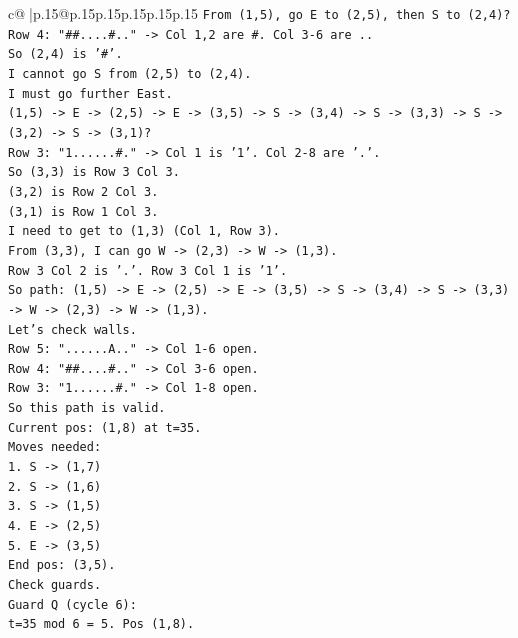 \documentclass{article}
\begin{document}
{\begin{supertabular}{c@{$\;$}|p{.15\linewidth}@{}p{.15\linewidth}p{.15\linewidth}p{.15\linewidth}p{.15\linewidth}p{.15\linewidth}}
{{{\texttt{From (1,5), go E to (2,5), then S to (2,4)?} \\
\texttt{Row 4: "\#\#....\#.." {-}> Col 1,2 are \#. Col 3{-}6 are ..} \\
\texttt{So (2,4) is '\#'.} \\
\texttt{I cannot go S from (2,5) to (2,4).} \\
\texttt{I must go further East.} \\
\texttt{(1,5) {-}> E {-}> (2,5) {-}> E {-}> (3,5) {-}> S {-}> (3,4) {-}> S {-}> (3,3) {-}> S {-}> (3,2) {-}> S {-}> (3,1)?} \\
\texttt{Row 3: "1......\#." {-}> Col 1 is '1'. Col 2{-}8 are '.'.} \\
\texttt{So (3,3) is Row 3 Col 3.} \\
\texttt{(3,2) is Row 2 Col 3.} \\
\texttt{(3,1) is Row 1 Col 3.} \\
\texttt{I need to get to (1,3) (Col 1, Row 3).} \\
\texttt{From (3,3), I can go W {-}> (2,3) {-}> W {-}> (1,3).} \\
\texttt{Row 3 Col 2 is '.'. Row 3 Col 1 is '1'.} \\
\texttt{So path: (1,5) {-}> E {-}> (2,5) {-}> E {-}> (3,5) {-}> S {-}> (3,4) {-}> S {-}> (3,3) {-}> W {-}> (2,3) {-}> W {-}> (1,3).} \\
\texttt{Let's check walls.} \\
\texttt{Row 5: "......A.." {-}> Col 1{-}6 open.} \\
\texttt{Row 4: "\#\#....\#.." {-}> Col 3{-}6 open.} \\
\texttt{Row 3: "1......\#." {-}> Col 1{-}8 open.} \\
\texttt{So this path is valid.} \\
\texttt{Current pos: (1,8) at t=35.} \\
\texttt{Moves needed:} \\
\texttt{1. S {-}> (1,7)} \\
\texttt{2. S {-}> (1,6)} \\
\texttt{3. S {-}> (1,5)} \\
\texttt{4. E {-}> (2,5)} \\
\texttt{5. E {-}> (3,5)} \\
\texttt{End pos: (3,5).} \\
\texttt{Check guards.} \\
\texttt{Guard Q (cycle 6):} \\
\texttt{t=35 mod 6 = 5. Pos (1,8).} \\
}}}
\end{supertabular}}
\end{document}
